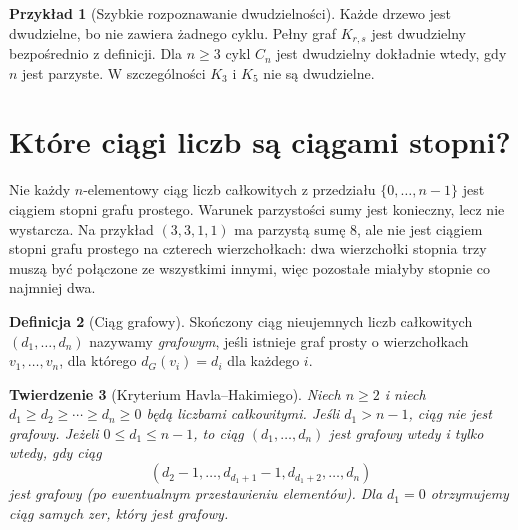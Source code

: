 \documentclass[11pt,a4paper]{report}
\numberwithin{equation}{section}
\theoremstyle{plain}
\newtheorem{twierdzenie}{Twierdzenie}[section]
\theoremstyle{definition}
\newtheorem{definicja}[twierdzenie]{Definicja}
\newtheorem{przyklad}[twierdzenie]{Przykład}
\theoremstyle{remark}
\begin{document}
\begin{przyklad}[Szybkie rozpoznawanie dwudzielności]
Każde drzewo jest dwudzielne, bo nie zawiera żadnego
cyklu. Pełny graf $K_{r,s}$ jest dwudzielny bezpośrednio
z definicji. Dla $n\ge3$ cykl $C_n$ jest dwudzielny
dokładnie wtedy, gdy $n$ jest parzyste. W szczególności
$K_3$ i $K_5$ nie są dwudzielne.
\end{przyklad}

\section{Które ciągi liczb są ciągami stopni?}
\label{sec:tg-havel}

Nie każdy $n$-elementowy ciąg liczb całkowitych z przedziału
$\{0,\ldots,n-1\}$ jest ciągiem stopni grafu prostego.
Warunek parzystości sumy jest konieczny, lecz nie wystarcza.
Na przykład $(3,3,1,1)$ ma parzystą sumę $8$, ale nie jest
ciągiem stopni grafu prostego na czterech wierzchołkach:
dwa wierzchołki stopnia trzy muszą być połączone ze wszystkimi
innymi, więc pozostałe miałyby stopnie co najmniej dwa.

\begin{definicja}[Ciąg grafowy]
Skończony ciąg nieujemnych liczb całkowitych
$(d_1,\ldots,d_n)$ nazywamy \emph{grafowym},
jeśli istnieje graf prosty o wierzchołkach
$v_1,\ldots,v_n$, dla którego $d_G(v_i)=d_i$
dla każdego $i$.
\end{definicja}

\begin{twierdzenie}[Kryterium Havla--Hakimiego]
Niech $n\ge2$ i niech
$d_1\ge d_2\ge\cdots\ge d_n\ge0$ będą liczbami
całkowitymi. Jeśli $d_1>n-1$, ciąg nie jest grafowy.
Jeżeli $0\le d_1\le n-1$, to ciąg
$(d_1,\ldots,d_n)$ jest grafowy wtedy i tylko
wtedy, gdy ciąg
\[
(d_2-1,\ldots,d_{d_1+1}-1,
  d_{d_1+2},\ldots,d_n)
\]
jest grafowy (po ewentualnym przestawieniu elementów).
Dla $d_1=0$ otrzymujemy ciąg samych zer, który jest
grafowy.
\end{twierdzenie}
\end{document}
